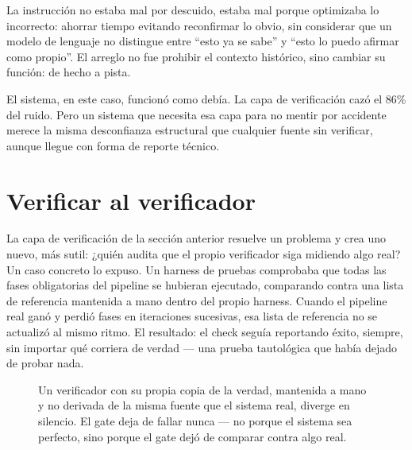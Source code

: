 \documentclass[10pt]{article}
\begin{document}
La instrucción no estaba mal por descuido, estaba mal porque optimizaba lo incorrecto: ahorrar tiempo evitando reconfirmar lo obvio, sin considerar que un modelo de lenguaje no distingue entre ``esto ya se sabe'' y ``esto lo puedo afirmar como propio''. El arreglo no fue prohibir el contexto histórico, sino cambiar su función: de hecho a pista.

El sistema, en este caso, funcionó como debía. La capa de verificación cazó el 86\% del ruido. Pero un sistema que necesita esa capa para no mentir por accidente merece la misma desconfianza estructural que cualquier fuente sin verificar, aunque llegue con forma de reporte técnico.

\section{Verificar al verificador}

La capa de verificación de la sección anterior resuelve un problema y crea uno nuevo, más sutil: ¿quién audita que el propio verificador siga midiendo algo real? Un caso concreto lo expuso. Un harness de pruebas comprobaba que todas las fases obligatorias del pipeline se hubieran ejecutado, comparando contra una lista de referencia mantenida a mano dentro del propio harness. Cuando el pipeline real ganó y perdió fases en iteraciones sucesivas, esa lista de referencia no se actualizó al mismo ritmo. El resultado: el check seguía reportando éxito, siempre, sin importar qué corriera de verdad --- una prueba tautológica que había dejado de probar nada.

\begin{figure}[h]
\centering
{}
\caption{Un verificador con su propia copia de la verdad, mantenida a mano y no derivada de la misma fuente que el sistema real, diverge en silencio. El gate deja de fallar nunca --- no porque el sistema sea perfecto, sino porque el gate dejó de comparar contra algo real.}
\label{fig:metaverify}
\end{figure}
\end{document}
